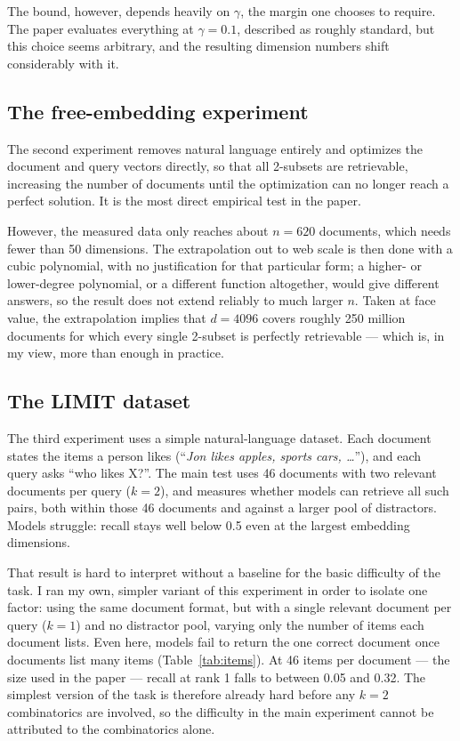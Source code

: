 \documentclass[11pt]{article}
\begin{document}
The bound, however, depends heavily on $\gamma$, the margin one chooses to require. The paper evaluates everything at $\gamma = 0.1$, described as roughly standard, but this choice seems arbitrary, and the resulting dimension numbers shift considerably with it.

\subsection{The free-embedding experiment}

The second experiment removes natural language entirely and optimizes the document and query vectors directly, so that all 2-subsets are retrievable, increasing the number of documents until the optimization can no longer reach a perfect solution. It is the most direct empirical test in the paper.

However, the measured data only reaches about $n = 620$ documents, which needs fewer than 50 dimensions. The extrapolation out to web scale is then done with a cubic polynomial, with no justification for that particular form; a higher- or lower-degree polynomial, or a different function altogether, would give different answers, so the result does not extend reliably to much larger $n$. Taken at face value, the extrapolation implies that $d = 4096$ covers roughly 250 million documents for which every single 2-subset is perfectly retrievable --- which is, in my view, more than enough in practice.

\subsection{The LIMIT dataset}

The third experiment uses a simple natural-language dataset. Each document states the items a person likes (``\textit{Jon likes apples, sports cars, \dots}''), and each query asks ``who likes X?''. The main test uses 46 documents with two relevant documents per query ($k=2$), and measures whether models can retrieve all such pairs, both within those 46 documents and against a larger pool of distractors. Models struggle: recall stays well below 0.5 even at the largest embedding dimensions.

That result is hard to interpret without a baseline for the basic difficulty of the task. I ran my own, simpler variant of this experiment in order to isolate one factor: using the same document format, but with a single relevant document per query ($k=1$) and no distractor pool, varying only the number of items each document lists. Even here, models fail to return the one correct document once documents list many items (Table~\ref{tab:items}). At 46 items per document --- the size used in the paper --- recall at rank 1 falls to between 0.05 and 0.32. The simplest version of the task is therefore already hard before any $k=2$ combinatorics are involved, so the difficulty in the main experiment cannot be attributed to the combinatorics alone.
\end{document}
